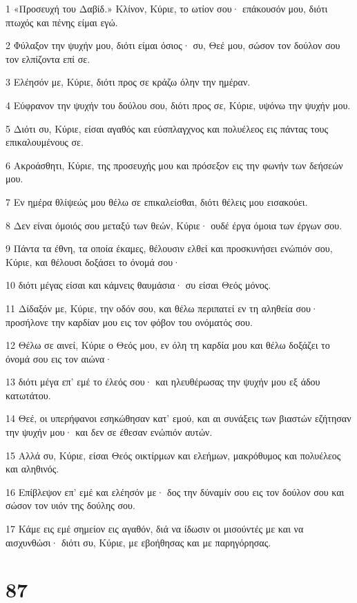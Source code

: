 \par 1 «Προσευχή του Δαβίδ.» Κλίνον, Κύριε, το ωτίον σου· επάκουσόν μου, διότι πτωχός και πένης είμαι εγώ.
\par 2 Φύλαξον την ψυχήν μου, διότι είμαι όσιος· συ, Θεέ μου, σώσον τον δούλον σου τον ελπίζοντα επί σε.
\par 3 Ελέησόν με, Κύριε, διότι προς σε κράζω όλην την ημέραν.
\par 4 Εύφρανον την ψυχήν του δούλου σου, διότι προς σε, Κύριε, υψόνω την ψυχήν μου.
\par 5 Διότι συ, Κύριε, είσαι αγαθός και εύσπλαγχνος και πολυέλεος εις πάντας τους επικαλουμένους σε.
\par 6 Ακροάσθητι, Κύριε, της προσευχής μου και πρόσεξον εις την φωνήν των δεήσεών μου.
\par 7 Εν ημέρα θλίψεώς μου θέλω σε επικαλείσθαι, διότι θέλεις μου εισακούει.
\par 8 Δεν είναι όμοιός σου μεταξύ των θεών, Κύριε· ουδέ έργα όμοια των έργων σου.
\par 9 Πάντα τα έθνη, τα οποία έκαμες, θέλουσιν ελθεί και προσκυνήσει ενώπιόν σου, Κύριε, και θέλουσι δοξάσει το όνομά σου·
\par 10 διότι μέγας είσαι και κάμνεις θαυμάσια· συ είσαι Θεός μόνος.
\par 11 Δίδαξόν με, Κύριε, την οδόν σου, και θέλω περιπατεί εν τη αληθεία σου· προσήλονε την καρδίαν μου εις τον φόβον του ονόματός σου.
\par 12 Θέλω σε αινεί, Κύριε ο Θεός μου, εν όλη τη καρδία μου και θέλω δοξάζει το όνομά σου εις τον αιώνα·
\par 13 διότι μέγα επ' εμέ το έλεός σου· και ηλευθέρωσας την ψυχήν μου εξ άδου κατωτάτου.
\par 14 Θεέ, οι υπερήφανοι εσηκώθησαν κατ' εμού, και αι συνάξεις των βιαστών εζήτησαν την ψυχήν μου· και δεν σε έθεσαν ενώπιόν αυτών.
\par 15 Αλλά συ, Κύριε, είσαι Θεός οικτίρμων και ελεήμων, μακρόθυμος και πολυέλεος και αληθινός.
\par 16 Επίβλεψον επ' εμέ και ελέησόν με· δος την δύναμίν σου εις τον δούλον σου και σώσον τον υιόν της δούλης σου.
\par 17 Κάμε εις εμέ σημείον εις αγαθόν, διά να ίδωσιν οι μισούντές με και να αισχυνθώσι· διότι συ, Κύριε, με εβοήθησας και με παρηγόρησας.

\chapter{87}

